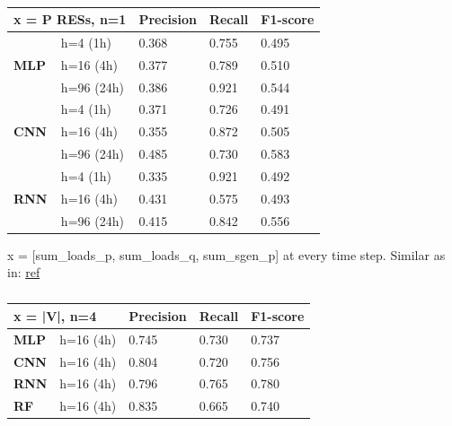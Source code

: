 \begin{table}[H]
\centering
\begin{tabular}{|ll|l|l|l|}
\hline
\multicolumn{2}{|l|}{x = P RESs, n=1} & \textbf{Precision} & \textbf{Recall} & \textbf{F1-score} \\ \hline
\multicolumn{1}{|l|}{\multirow{3}{*}{\textbf{MLP}}} & h=4 (1h)   & 0.368 & 0.755 & 0.495 \\ \cline{2-5} 
\multicolumn{1}{|l|}{}                              & h=16 (4h)  & 0.377 & 0.789 & 0.510 \\ \cline{2-5} 
\multicolumn{1}{|l|}{}                              & h=96 (24h) & 0.386 & 0.921 & 0.544 \\ \hline
\multicolumn{1}{|l|}{\multirow{3}{*}{\textbf{CNN}}} & h=4 (1h)   & 0.371 & 0.726 & 0.491 \\ \cline{2-5} 
\multicolumn{1}{|l|}{}                              & h=16 (4h)  & 0.355 & 0.872 & 0.505 \\ \cline{2-5} 
\multicolumn{1}{|l|}{}                              & h=96 (24h) & 0.485 & 0.730 & 0.583 \\ \hline
\multicolumn{1}{|l|}{\multirow{3}{*}{\textbf{RNN}}} & h=4 (1h)   & 0.335 & 0.921 & 0.492 \\ \cline{2-5} 
\multicolumn{1}{|l|}{}                              & h=16 (4h)  & 0.431 & 0.575 & 0.493 \\ \cline{2-5} 
\multicolumn{1}{|l|}{}                              & h=96 (24h) & 0.415 & 0.842 & 0.556 \\ \hline
\end{tabular}
\caption{}
\label{tab:my-table}
\end{table}

x = [sum\_loads\_p, sum\_loads\_q, sum\_sgen\_p] at every time step. Similar as in: \href{https://arxiv.org/abs/2008.09384}{ref}
\begin{table}[H]
\centering
\begin{tabular}{|ll|l|l|l|}
\hline
\multicolumn{2}{|l|}{x = |V|, n=4} & \textbf{Precision} & \textbf{Recall} & \textbf{F1-score} \\ \hline
\multicolumn{1}{|l|}{\textbf{MLP}} & h=16 (4h) & 0.745 & 0.730 & 0.737 \\ \hline
\multicolumn{1}{|l|}{\textbf{CNN}} & h=16 (4h) & 0.804 & 0.720 & 0.756 \\ \hline
\multicolumn{1}{|l|}{\textbf{RNN}} & h=16 (4h) & 0.796 & 0.765 & 0.780 \\ \hline
\multicolumn{1}{|l|}{\textbf{RF}}  & h=16 (4h) & 0.835 & 0.665 & 0.740 \\ \hline
\end{tabular}
\caption{}
\label{tab:my-table}
\end{table}


